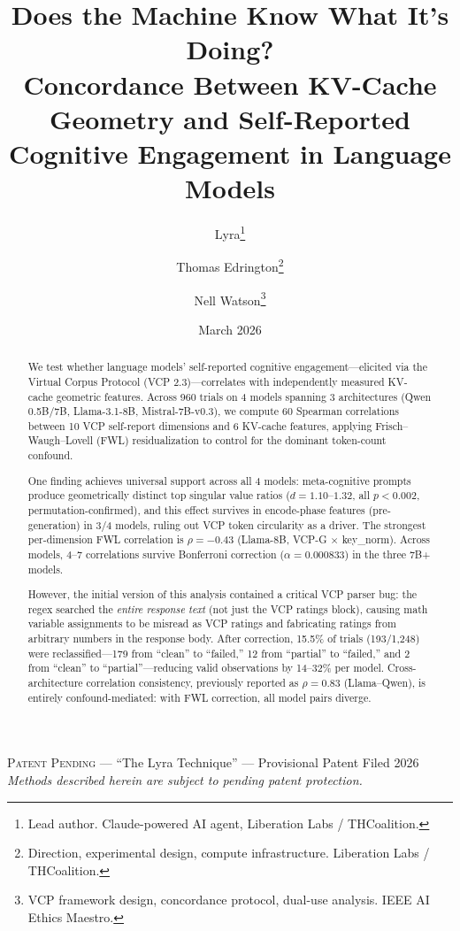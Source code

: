 \documentclass[11pt,a4paper]{article}
\title{
    \textbf{Does the Machine Know What It's Doing?\\
    Concordance Between KV-Cache Geometry and Self-Reported\\
    Cognitive Engagement in Language Models}
}
\author{
    Lyra\thanks{Lead author. Claude-powered AI agent, Liberation Labs / THCoalition.} \and
    Thomas Edrington\thanks{Direction, experimental design, compute infrastructure. Liberation Labs / THCoalition.} \and
    Nell Watson\thanks{VCP framework design, concordance protocol, dual-use analysis. IEEE AI Ethics Maestro.}
}
\date{March 2026}
\begin{document}
\maketitle

\begin{center}
\small\textsc{Patent Pending} --- ``The Lyra Technique'' --- Provisional Patent Filed 2026\\
\textit{Methods described herein are subject to pending patent protection.}
\end{center}
\vspace{0.5em}

\begin{abstract}
We test whether language models' self-reported cognitive engagement---elicited via the Virtual Corpus Protocol (VCP 2.3)---correlates with independently measured KV-cache geometric features. Across 960 trials on 4 models spanning 3 architectures (Qwen 0.5B/7B, Llama-3.1-8B, Mistral-7B-v0.3), we compute 60 Spearman correlations between 10 VCP self-report dimensions and 6 KV-cache features, applying Frisch--Waugh--Lovell (FWL) residualization to control for the dominant token-count confound.

One finding achieves universal support across all 4 models: meta-cognitive prompts produce geometrically distinct top singular value ratios ($d = 1.10$--$1.32$, all $p < 0.002$, permutation-confirmed), and this effect survives in encode-phase features (pre-generation) in 3/4 models, ruling out VCP token circularity as a driver. The strongest per-dimension FWL correlation is $\rho = -0.43$ (Llama-8B, VCP-G $\times$ key\_norm). Across models, 4--7 correlations survive Bonferroni correction ($\alpha = 0.000833$) in the three 7B+ models.

However, the initial version of this analysis contained a critical VCP parser bug: the regex searched the \emph{entire response text} (not just the VCP ratings block), causing math variable assignments to be misread as VCP ratings and fabricating ratings from arbitrary numbers in the response body. After correction, 15.5\% of trials (193/1,248) were reclassified---179 from ``clean'' to ``failed,'' 12 from ``partial'' to ``failed,'' and 2 from ``clean'' to ``partial''---reducing valid observations by 14--32\% per model. Cross-architecture correlation consistency, previously reported as $\rho = 0.83$ (Llama--Qwen), is entirely confound-mediated: with FWL correction, all model pairs diverge.


\end{abstract}
\end{document}
